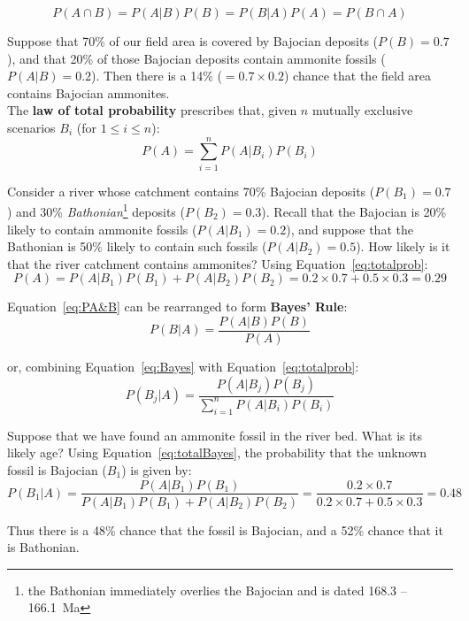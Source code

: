 \begin{equation}
  P({A}\cap{B}) = P(A|B) P(B) = P(B|A) P(A) = P({B}\cap{A})
  \label{eq:PA&B}
\end{equation}

Suppose that 70\% of our field area is covered by Bajocian deposits
($P(B)=0.7$), and that 20\% of those Bajocian deposits contain
ammonite fossils ($P(A|B)=0.2$). Then there is a 14\%
($=0.7\times{0.2}$) chance that the field area contains Bajocian
ammonites.\\

The \textbf{law of total probability} prescribes that, given $n$
mutually exclusive scenarios $B_i$ (for $1\leq{i}\leq{n}$):
\begin{equation}
  P(A) = \sum\limits_{i=1}^{n} P(A|B_i) P(B_i)
  \label{eq:totalprob}
\end{equation}

Consider a river whose catchment contains 70\% Bajocian deposits
($P(B_1)=0.7$) and 30\% \emph{Bathonian}\footnote{the Bathonian
  immediately overlies the Bajocian and is dated 168.3 -- 166.1~Ma}
deposits ($P(B_2)=0.3$). Recall that the Bajocian is 20\% likely to
contain ammonite fossils ($P(A|B_1)=0.2$), and suppose that the
Bathonian is 50\% likely to contain such fossils ($P(A|B_2)=0.5$).
How likely is it that the river catchment contains ammonites? Using
Equation~\ref{eq:totalprob}:
\[
P(A) = P(A|B_1) P(B_1) + P(A|B_2) P(B_2) =
0.2 \times 0.7 + 0.5 \times 0.3 = 0.29
\]

Equation~\ref{eq:PA&B} can be rearranged to form \textbf{Bayes' Rule}:
\begin{equation}
  P(B|A) = \frac{P(A|B) P(B)}{P(A)}
  \label{eq:Bayes}
\end{equation}

\noindent or, combining Equation~\ref{eq:Bayes} with
Equation~\ref{eq:totalprob}:
\begin{equation}
  P(B_j|A) = \frac{P(A|B_j) P(B_j)}{\sum\limits_{i=1}^{n}P(A|B_i) P(B_i)}
  \label{eq:totalBayes}
\end{equation}

Suppose that we have found an ammonite fossil in the river bed.  What
is its likely age? Using Equation~\ref{eq:totalBayes}, the probability
that the unknown fossil is Bajocian ($B_1$) is given by:
\[
  P(B_1|A) = \frac{P(A|B_1) P(B_1)}{P(A|B_1) P(B_1) + P(A|B_2) P(B_2)} = 
   \frac{0.2 \times 0.7}{0.2 \times 0.7 + 0.5 \times 0.3} = 0.48
\]

Thus there is a 48\% chance that the fossil is Bajocian, and a 52\%
chance that it is Bathonian.
